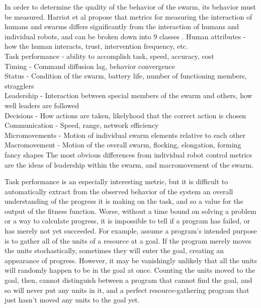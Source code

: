 \documentclass[]{article}
\begin{document}
In order to determine the quality of the behavior of the swarm, its behavior must be measured.
Harriot et al propose that metrics for measuring the interaction of humans and swarms differs significantly from the interaction of humans and individual robots, and can be broken down into 9 classes \cite{harriott2014biologically}. 
Human attributes - how the human interacts, trust, intervention frequency, etc. \\
Task performance - ability to accomplish task, speed, accuracy, cost \\
Timing - Command diffusion lag, behavior convergence \\
Status - Condition of the swarm, battery life, number of functioning members, stragglers \\
Leadership - Interaction between special members of the swarm and others, how well leaders are followed \\
Decisions - How actions are taken, likelyhood that the correct action is chosen \\
Communication - Speed, range, network efficiency \\
Micromovements - Motion of individual swarm elements relative to each other \\
Macromovement - Motion of the overall swarm, flocking, elongation, forming fancy shapes 
The most obvious differences from individual robot control metrics are the ideas of leadership within the swarm, and macromovement of the swarm.

Task performance is an especially interesting metric, but it is difficult to automatically extract from the observed behavior of the system an overall understanding of the progress it is making on the task, and so a value for the output of the fitness function. 
Worse, without a time bound on solving a problem or a way to calculate progress, it is impossible to tell if a program has failed, or has merely not yet succeeded.
For example, assume a program's intended purpose is to gather all of the units of a resource at a goal. 
If the program merely moves the units stochastically, sometimes they will enter the goal, creating an appearance of progress. 
However, it may be vanishingly unlikely that all the units will randomly happen to be in the goal at once. 
Counting the units moved to the goal, then, cannot distinguish between a program that cannot find the goal, and so will never put any units in it, and a perfect resource-gathering program that just hasn't moved any units to the goal yet.
 
\end{document}
